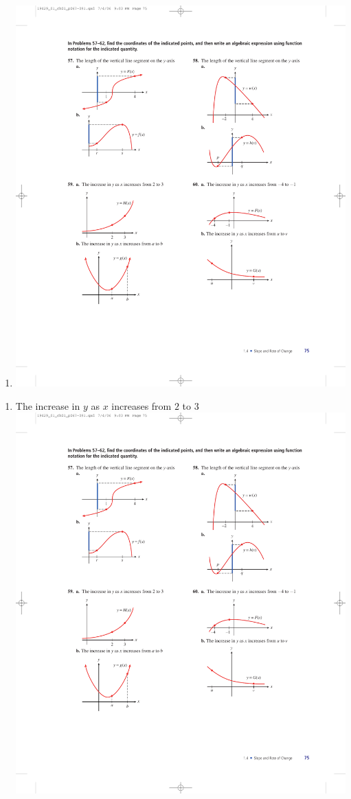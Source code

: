 \documentclass[10pt,]{book}
\theoremstyle{plain}
\theoremstyle{definition}
\theoremstyle{definition}
\theoremstyle{definition}
\theoremstyle{definition}
\numberwithin{equation}{part}
\begin{document}
\begin{exercisegroup}
\begin{multicols}{2}
\begin{enumerate}[label=*\alph**]
\item\hypertarget{li-1077}{}\includegraphics[width=0.8\linewidth]{images/fig-ex-1-4-58b}
%
\end{enumerate}
\end{multicols}
%
\exercise[59.]\hypertarget{exercise-274}{}\leavevmode%
\begin{multicols}{2}
\begin{enumerate}[label=*\alph**]
\item\hypertarget{li-1078}{}The increase in \(y\) as \(x\) increases from \(2\) to \(3\) \includegraphics[width=0.8\linewidth]{images/fig-ex-1-4-59a}

\end{enumerate}
\end{multicols}
\end{exercisegroup}
\end{document}
